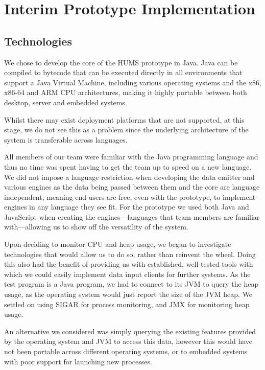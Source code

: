 \documentclass[10pt,a4paper]{article}
\begin{document}
\section{Interim Prototype Implementation}

\subsection{Technologies}

We chose to develop the core of the HUMS prototype in Java. Java can
be compiled to bytecode that can be executed directly in all
environments that support a Java Virtual Machine, including various
operating systems and the x86, x86-64 and ARM CPU architectures,
making it highly portable between both desktop, server and embedded
systems. %

Whilst there may exist deployment platforms that are not supported, at
this stage, we do not see this as a problem since the underlying
architecture of the system is transferable across languages.

All members of our team were familiar with the Java programming
language and thus no time was spent having to get the team up to speed
on a new language. We did not impose a language restriction when
developing the data emitter and various engines as the data being
passed between them and the core are language independent, meaning 
end users are free, even with the prototype, to implement engines in any
language they see fit. For the prototype we used both Java and
JavaScript when creating the engines---languages that team members are
familiar with---allowing us to show off the versatility of the system.

Upon deciding to monitor CPU and heap usage, we began to investigate
technologies that would allow us to do so, rather than reinvent the wheel.
Doing this also had the benefit of providing us with established, well-tested
tools with which we could easily implement data input clients for further
systems. As the test program is a Java program, we had to connect to its JVM to query the heap usage, as the operating system would just report the size of the JVM heap. We settled on using SIGAR for process monitoring, and JMX for monitoring heap usage.

An alternative we considered was simply querying the existing features provided
by the operating system and JVM to access this data, however this would have
not been portable across different operating systems, or to embedded systems
with poor support for launching new processes.
\end{document}
